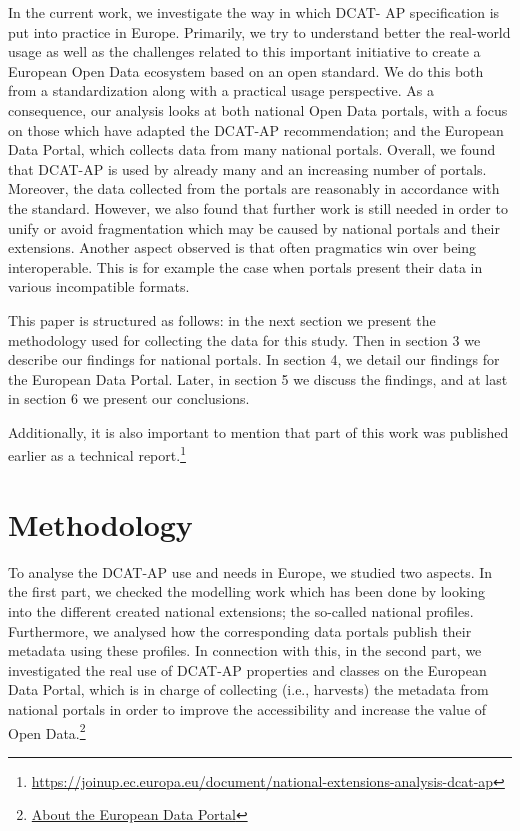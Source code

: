 \documentclass[<options>]{elsarticle}
\begin{document}
In the current work, we investigate the way in which DCAT- AP specification is put into practice in Europe. Primarily, we try to understand better the real-world usage as well as the challenges related to this important initiative to create a European Open Data ecosystem based on an open standard. We do this both from a standardization along with a practical usage perspective. As a consequence, our analysis looks at both national Open Data portals, with a focus on those which have adapted the DCAT-AP recommendation; and the European Data Portal, which collects data from many national portals. Overall, we found that DCAT-AP is used by already many and an increasing number of portals. Moreover, the data collected from the portals are reasonably in accordance with the standard. However, we also found that further work is still needed in order to unify or avoid fragmentation which may be caused by national portals and their extensions. Another aspect observed is that often pragmatics win over being interoperable. This is for example the case when portals present their data in various incompatible formats.

This paper is structured as follows: in the next section we present the methodology used for collecting the data for this study. Then in section 3 we describe our findings for national portals. In section 4, we detail our findings for the European Data Portal. Later, in section 5 we discuss the findings, and at last in section 6 we present our conclusions. 

Additionally, it is also important to mention that part of this  work was published earlier as a technical report.\footnote{\href{https://joinup.ec.europa.eu/document/national-extensions-analysis-dcat-ap}{https://joinup.ec.europa.eu/document/national-extensions-analysis-dcat-ap}}

\section{Methodology}
To analyse the DCAT-AP use and needs in Europe, we studied two aspects. In the first part, we checked the modelling work which has been done by looking into the different created national extensions; the so-called national profiles. Furthermore, we analysed how the corresponding data portals publish their metadata using these profiles. In connection with this, in the second part, we investigated the real use of DCAT-AP properties and classes on the European Data Portal, which is in charge of collecting (i.e., harvests) the metadata from national portals in order to improve the accessibility and increase the value of Open Data.\footnote{\href{https://www.europeandataportal.eu/en/what-we-do/our-activities}{About the European Data Portal}}
\end{document}
